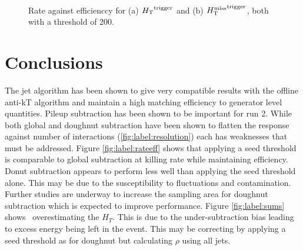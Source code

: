 \begin{figure}
    \begin{center} 
	~
	\caption{Rate against efficienccy for (a)  $\mbox{$H_\text{T}$}^{\text{trigger}}$ and (b) $\mbox{$H_{\rm T}^{\rm miss}$}^{\text{trigger}}$, both with a
	threshold of 200\GeV.}
	    \label{fig:rate_eff_sum}
    \end{center} 
\end{figure}
\section{Conclusions}

The jet algorithm has been shown to give very compatible 
results with the offline anti-kT algorithm and maintain a high matching efficiency to generator level 
quantities.  Pileup subtraction has been shown to be important for  run 2. While both global 
and doughnut subtraction have been shown to flatten the response against number of interactions (\ref{fig:label:resolution}) 
each has weaknesses that must be addressed. Figure \ref{fig:label:rateeff} shows that applying a seed threshold 
is comparable to global subtraction at killing rate while maintaining efficiency. Donut subtraction appears to 
perform less well than applying the seed threshold alone. This may be due to the 
susceptibility to fluctuations and contamination. Further studies are underway to increase the sampling area for 
doughnut subtraction which is expected to improve performance. Figure \ref{fig:label:sums} shows \rhoG~overestimating the 
$H_T$. This is due to the under-subtraction bias leading to excess energy being left in 
the event. This may be correcting by applying a seed threshold as for doughnut but 
calculating $\rho$ using all jets. 

